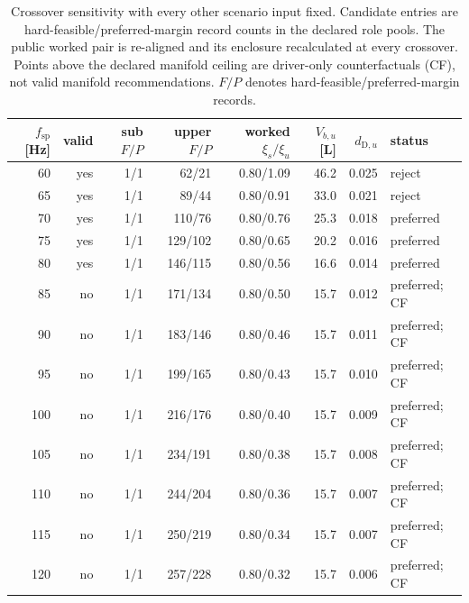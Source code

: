 \begin{table}[htbp]
\centering
\caption{Crossover sensitivity with every other scenario input fixed. Candidate entries are hard-feasible/preferred-margin record counts in the declared role pools. The public worked pair is re-aligned and its enclosure recalculated at every crossover. Points above the declared manifold ceiling are driver-only counterfactuals (CF), not valid manifold recommendations. $F/P$ denotes hard-feasible/preferred-margin records.}
\label{tab:split-sensitivity}
\scriptsize
\setlength{\tabcolsep}{2pt}
\begin{tabular}{rrrrrrrl}
\toprule
$f_{\mathrm{sp}}$ [Hz] & valid & sub $F/P$ & upper $F/P$ & worked $\xi_s/\xi_u$ & $V_{b,u}$ [L] & $d_{\mathrm D,u}$ & status\\
\midrule
60 & yes & 1/1 & 62/21 & 0.80/1.09 & 46.2 & 0.025 & reject\\
65 & yes & 1/1 & 89/44 & 0.80/0.91 & 33.0 & 0.021 & reject\\
70 & yes & 1/1 & 110/76 & 0.80/0.76 & 25.3 & 0.018 & preferred\\
75 & yes & 1/1 & 129/102 & 0.80/0.65 & 20.2 & 0.016 & preferred\\
80 & yes & 1/1 & 146/115 & 0.80/0.56 & 16.6 & 0.014 & preferred\\
85 & no & 1/1 & 171/134 & 0.80/0.50 & 15.7 & 0.012 & preferred; CF\\
90 & no & 1/1 & 183/146 & 0.80/0.46 & 15.7 & 0.011 & preferred; CF\\
95 & no & 1/1 & 199/165 & 0.80/0.43 & 15.7 & 0.010 & preferred; CF\\
100 & no & 1/1 & 216/176 & 0.80/0.40 & 15.7 & 0.009 & preferred; CF\\
105 & no & 1/1 & 234/191 & 0.80/0.38 & 15.7 & 0.008 & preferred; CF\\
110 & no & 1/1 & 244/204 & 0.80/0.36 & 15.7 & 0.007 & preferred; CF\\
115 & no & 1/1 & 250/219 & 0.80/0.34 & 15.7 & 0.007 & preferred; CF\\
120 & no & 1/1 & 257/228 & 0.80/0.32 & 15.7 & 0.006 & preferred; CF\\
\bottomrule
\end{tabular}
\end{table}
